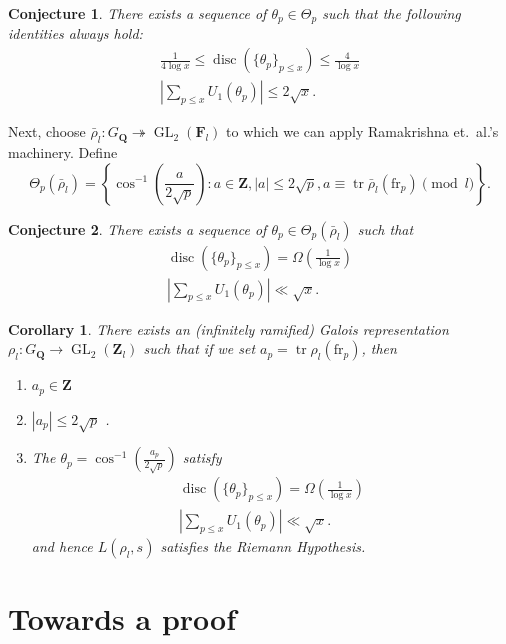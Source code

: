 \documentclass{article}
\DeclareMathOperator{\disc}{disc}
\DeclareMathOperator{\GL}{GL}
\DeclareMathOperator{\tr}{tr}
\newcommand{\bF}{\mathbf{F}}
\newcommand{\bQ}{\mathbf{Q}}
\newcommand{\bZ}{\mathbf{Z}}
\newcommand{\fr}{\mathrm{fr}}
\newtheorem{corollary}{Corollary}
\newtheorem{conjecture}{Conjecture}
\begin{document}
\begin{conjecture}
There exists a sequence of $\theta_p\in \Theta_p$ such that the following 
identities always hold:
\begin{align*}
	\frac{1}{4\log x} \leqslant \disc(\{\theta_p\}_{p\leqslant x}) \leqslant \frac{4}{\log x} \\
	\left| \sum_{p\leqslant x} U_1(\theta_p)\right| \leqslant 2 \sqrt{x} .
\end{align*}
\end{conjecture}

Next, choose $\bar\rho_l \colon G_\bQ \twoheadrightarrow \GL_2(\bF_l)$ to 
which we can apply Ramakrishna et.~al.'s machinery. Define 
\[
	\Theta_p(\bar\rho_l) = \left\{\cos^{-1}\left(\frac{a}{2\sqrt p}\right) : a\in \bZ, |a|\leqslant 2\sqrt p, a \equiv \tr \bar\rho_l(\fr_p)\pmod l\right\} .
\]
\begin{conjecture}
There exists a sequence of $\theta_p\in \Theta_p(\bar\rho_l)$ such that 
\begin{align*}
	\disc(\{\theta_p\}_{p\leqslant x}) =\Omega\left( \frac{1}{\log x} \right)\\
	\left| \sum_{p\leqslant x} U_1(\theta_p)\right| \ll \sqrt{x} .
\end{align*}
\end{conjecture}

\begin{corollary}
There exists an (infinitely ramified) Galois representation 
$\rho_l\colon G_\bQ \to \GL_2(\bZ_l)$ such that if we set 
$a_p = \tr\rho_l(\fr_p)$, then 
\begin{enumerate}
\item
$a_p\in \bZ$
\item
$|a_p| \leqslant 2\sqrt p$ .
\item
The $\theta_p = \cos^{-1}\left(\frac{a_p}{2\sqrt p}\right)$ satisfy 
\begin{align*}
	\disc(\{\theta_p\}_{p\leqslant x}) =\Omega\left( \frac{1}{\log x} \right)\\
	\left| \sum_{p\leqslant x} U_1(\theta_p)\right| \ll \sqrt{x} .
\end{align*}
and hence $L(\rho_l,s)$ satisfies the Riemann Hypothesis. 
\end{enumerate}
\end{corollary}





\section{Towards a proof}
\end{document}
